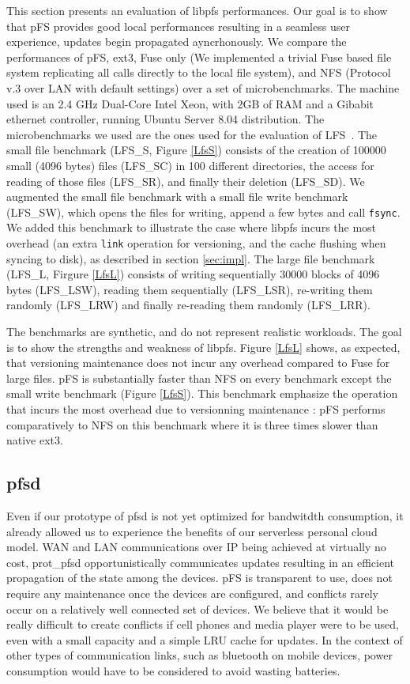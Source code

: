 This section presents an evaluation of libpfs performances. Our goal
is to show that pFS provides good local performances resulting in a
seamless user experience, updates begin propagated ayncrhonously. We
compare the performances of pFS, ext3, Fuse only (We implemented a
trivial Fuse based file system replicating all calls directly to the
local file system), and NFS (Protocol v.3 over LAN with default
settings) over a set of microbenchmarks. The machine used is an 2.4
GHz Dual-Core Intel Xeon, with 2GB of RAM and a Gibabit ethernet
controller, running Ubuntu Server 8.04 distribution. The
microbenchmarks we used are the ones used for the evaluation of
LFS~\cite{rosenblum:lfs}. The small file benchmark (LFS\_S, Figure
\ref{LfsS}) consists of the creation of 100000 small (4096 bytes)
files (LFS\_SC) in 100 different directories, the access for reading
of those files (LFS\_SR), and finally their deletion (LFS\_SD). We
augmented the small file benchmark with a small file write benchmark
(LFS\_SW), which opens the files for writing, append a few bytes and
call {\tt fsync}.  We added this benchmark to illustrate the case where
libpfs incurs the most overhead (an extra {\tt link} operation for
versioning, and the cache flushing when syncing to disk), as described in
section \ref{sec:impl}. The large file benchmark (LFS\_L, Firgure
\ref{LfsL}) consists of writing sequentially 30000 blocks of 4096
bytes (LFS\_LSW), reading them sequentially (LFS\_LSR), re-writing
them randomly (LFS\_LRW) and finally re-reading them randomly
(LFS\_LRR).

The benchmarks are synthetic, and do not represent realistic
workloads. The goal is to show the strengths and weakness of
libpfs. Figure \ref{LfsL} shows, as expected, that versioning
maintenance does not incur any overhead compared to Fuse for large
files. pFS is substantially faster than NFS on every benchmark except
the small write benchmark (Figure \ref{LfsS}). This benchmark
emphasize the operation that incurs the most overhead due to
versionning maintenance : pFS performs comparatively to NFS on this
benchmark where it is three times slower than native ext3.

\subsection{pfsd}

Even if our prototype of pfsd is not yet optimized for bandwitdth
consumption, it already allowed us to experience the benefits of our
serverless personal cloud model. WAN and LAN communications over IP
being achieved at virtually no cost, prot\_pfsd opportunistically
communicates updates resulting in an efficient propagation of the
state among the devices. pFS is transparent to use, does not require
any maintenance once the devices are configured, and conflicts rarely
occur on a relatively well connected set of devices. We believe that
it would be really difficult to create conflicts if cell phones and
media player were to be used, even with a small capacity and a simple
LRU cache for updates. In the context of other types of communication
links, such as bluetooth on mobile devices, power consumption would
have to be considered to avoid wasting batteries.

